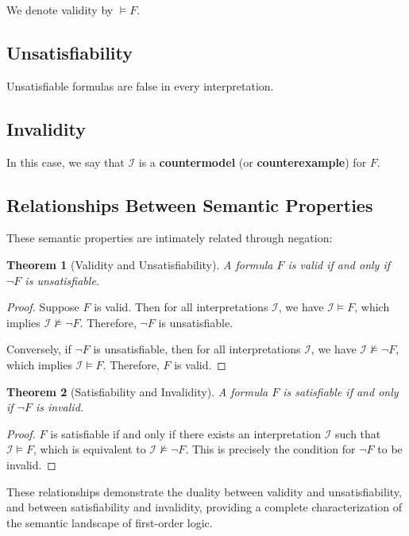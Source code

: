 \documentclass[11pt,a4paper]{article}
\theoremstyle{definition}
\theoremstyle{plain}
\newtheorem{theorem}{Theorem}[section]
\theoremstyle{remark}
\begin{document}
We denote validity by $\models F$.

\subsection{Unsatisfiability}

Unsatisfiable formulas are false in every interpretation.

\subsection{Invalidity}

In this case, we say that $\mathcal{I}$ is a \textbf{countermodel} (or \textbf{counterexample}) for $F$.

\subsection{Relationships Between Semantic Properties}

These semantic properties are intimately related through negation:

\begin{theorem}[Validity and Unsatisfiability]
A formula $F$ is valid if and only if $\neg F$ is unsatisfiable.
\end{theorem}

\begin{proof}
Suppose $F$ is valid. Then for all interpretations $\mathcal{I}$, we have $\mathcal{I} \models F$, which implies $\mathcal{I} \not\models \neg F$. Therefore, $\neg F$ is unsatisfiable.

Conversely, if $\neg F$ is unsatisfiable, then for all interpretations $\mathcal{I}$, we have $\mathcal{I} \not\models \neg F$, which implies $\mathcal{I} \models F$. Therefore, $F$ is valid.
\end{proof}

\begin{theorem}[Satisfiability and Invalidity]
A formula $F$ is satisfiable if and only if $\neg F$ is invalid.
\end{theorem}

\begin{proof}
$F$ is satisfiable if and only if there exists an interpretation $\mathcal{I}$ such that $\mathcal{I} \models F$, which is equivalent to $\mathcal{I} \not\models \neg F$. This is precisely the condition for $\neg F$ to be invalid.
\end{proof}

These relationships demonstrate the duality between validity and unsatisfiability, and between satisfiability and invalidity, providing a complete characterization of the semantic landscape of first-order logic.
\end{document}
